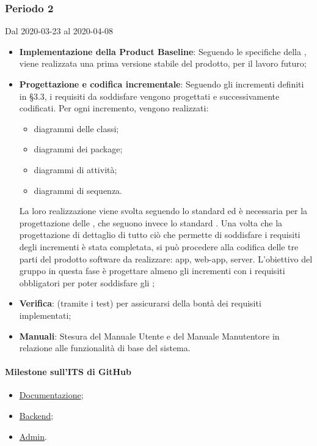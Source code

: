 \subsubsection{Periodo 2} 
Dal 2020-03-23 al 2020-04-08
\begin{itemize}
	\item \textbf{Implementazione della Product Baseline}: Seguendo le specifiche della , viene realizzata una prima versione stabile del prodotto,  per il lavoro futuro;
	\item \textbf{Progettazione e codifica incrementale}: Seguendo gli incrementi definiti in §3.3, i requisiti da soddisfare vengono progettati e successivamente codificati. Per ogni incremento, vengono realizzati:
	\begin{itemize}
		\item diagrammi delle classi;
		\item diagrammi dei package;
		\item diagrammi di attività;
		\item diagrammi di sequenza.
	\end{itemize}
	La loro realizzazione viene svolta seguendo lo standard  ed è necessaria per la progettazione delle , che seguono invece lo standard .
	Una volta che la progettazione di dettaglio di tutto ciò che permette di soddisfare i requisiti degli incrementi è stata completata, si può procedere alla codifica delle tre parti del prodotto software da realizzare: app, web-app, server.
	L'obiettivo del gruppo in questa fase è progettare almeno gli incrementi con i requisiti obbligatori per poter soddisfare gli ;
	\item \textbf{Verifica}:  (tramite i test) per assicurarsi della bontà dei requisiti implementati;
	\item \textbf{Manuali}: Stesura del Manuale Utente e del Manuale Manutentore in relazione alle funzionalità di base del sistema.
\end{itemize}
\paragraph{Milestone sull'ITS di GitHub}
\begin{itemize}
	\item \href{https://github.com/qb-team/Stalker-Documentazione/milestone/12}{Documentazione};
	\item \href{https://github.com/qb-team/Stalker-Backend/milestone/2}{Backend};
	\item \href{https://github.com/qb-team/Stalker-Admin/milestone/2}{Admin}.
\end{itemize}

